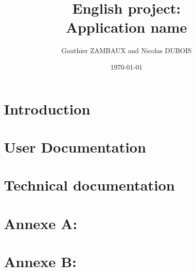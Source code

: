 \documentclass[11pt, a4paper]{report}
\title{English project:\\Application name}
\author{Gauthier ZAMBAUX and Nicolas DUBOIS}
\date{\today}
\begin{document}
\maketitle


\chapter*{Introduction}
\hspace{1cm}    \vspace{0.2cm}

\hspace{0.6cm}    \vspace{0.2cm}


\chapter*{User Documentation}


\chapter*{Technical documentation}





\newpage

\appendix
\chapter*{Annexe A: }

\newpage

\chapter*{Annexe B: }




\newpage
\end{document}
